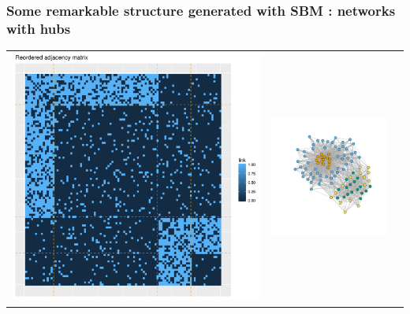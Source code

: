 \documentclass[nopagenumber,9pt]{beamer}
\begin{document}
\begin{frame}
\end{frame}




\begin{frame}
\frametitle{Some remarkable structure generated with SBM : networks with hubs}

\centering
\begin{tabular}{ccc}
 \includegraphics[scale=.2]{plots/sbm/Etoile_reordered_adja_with_groups.png}&
\includegraphics[scale=.2]{plots/sbm/Etoile_graphe_with_colors.png}&

\end{tabular}
\end{frame}
\end{document}
